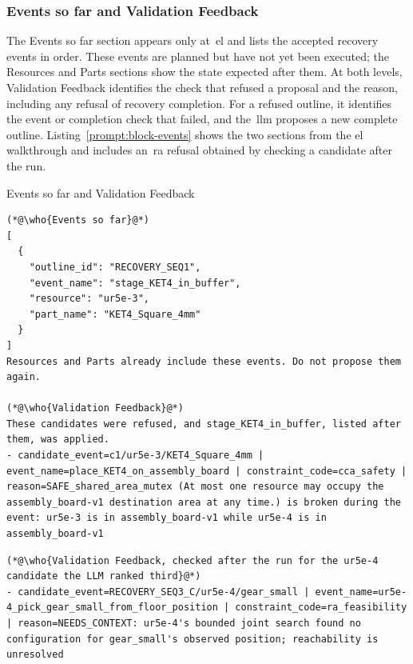 \subsubsection{Events so far and Validation Feedback}\label{sec:block-events}

The Events so far section appears only at~\gls{el} and lists the accepted recovery events in order.
These events are planned but have not yet been executed; the Resources and Parts sections show
the state expected after them. At both levels, Validation Feedback identifies the check that
refused a proposal and the reason, including any refusal of recovery completion. For a refused
outline, it identifies the event or completion check that failed, and the~\gls{llm} proposes a new
complete outline. Listing~\ref{prompt:block-events} shows the two sections from the \gls{el} walkthrough
and includes an~\gls{ra} refusal obtained by checking a candidate after the run.

\begin{recbox}{Events so far and Validation Feedback}
\begin{lstlisting}
(*@\who{Events so far}@*)
[
  {
    "outline_id": "RECOVERY_SEQ1",
    "event_name": "stage_KET4_in_buffer",
    "resource": "ur5e-3",
    "part_name": "KET4_Square_4mm"
  }
]
Resources and Parts already include these events. Do not propose them again.

(*@\who{Validation Feedback}@*)
These candidates were refused, and stage_KET4_in_buffer, listed after them, was applied.
- candidate_event=c1/ur5e-3/KET4_Square_4mm | event_name=place_KET4_on_assembly_board | constraint_code=cca_safety | reason=SAFE_shared_area_mutex (At most one resource may occupy the assembly_board-v1 destination area at any time.) is broken during the event: ur5e-3 is in assembly_board-v1 while ur5e-4 is in assembly_board-v1
\end{lstlisting}

\vspace{3pt}
\begin{lstlisting}
(*@\who{Validation Feedback, checked after the run for the ur5e-4 candidate the LLM ranked third}@*)
- candidate_event=RECOVERY_SEQ3_C/ur5e-4/gear_small | event_name=ur5e-4_pick_gear_small_from_floor_position | constraint_code=ra_feasibility | reason=NEEDS_CONTEXT: ur5e-4's bounded joint search found no configuration for gear_small's observed position; reachability is unresolved
\end{lstlisting}
\end{recbox}

